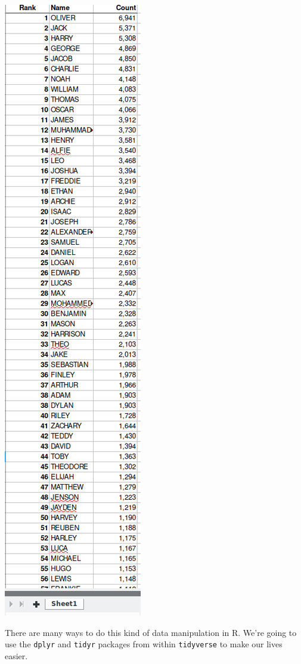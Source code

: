 \documentclass[
]{book}
\begin{document}
\includegraphics{R/RDataWrangling/images/clean.png}

There are many ways to do this kind of data manipulation in R. We're going to use the \texttt{dplyr} and \texttt{tidyr} packages from within \texttt{tidyverse} to make our lives easier.
\end{document}
